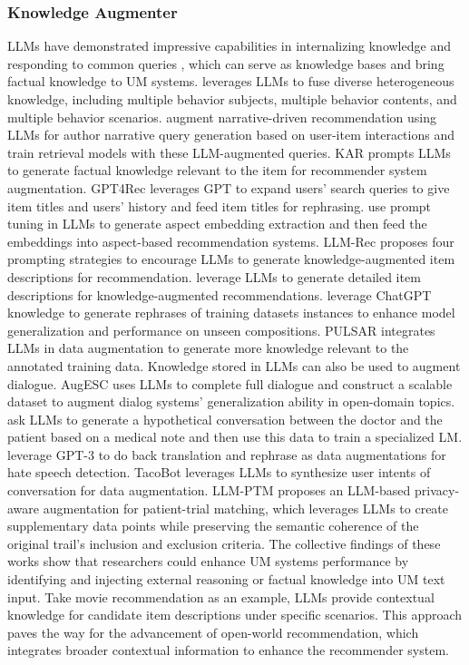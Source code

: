 \documentclass[11pt]{article}
\newcommand{\edit}[1]{\textcolor{blue}{#1}}
\newcommand{\comments}[1]{\textcolor{red}{[Re:~#1]}}
\begin{document}
\subsubsection{Knowledge Augmenter}
LLMs have demonstrated impressive capabilities in internalizing knowledge and responding to common queries \cite{ouyang2022training,openai2023gpt4}, which can serve as knowledge bases and bring factual knowledge to UM systems. \citet{yin2023heterogeneous} leverages LLMs to fuse diverse heterogeneous knowledge, including multiple behavior subjects, multiple behavior contents, and multiple behavior scenarios. \citet{mysore2023large} augment narrative-driven recommendation using LLMs for author narrative query generation based on user-item interactions and train retrieval models with these LLM-augmented queries. KAR \cite{xi2023towards} prompts LLMs to generate factual knowledge relevant to the item for recommender system augmentation. GPT4Rec \cite{li2023gpt4rec} leverages GPT to expand users' search queries to give item titles and users' history and feed item titles for rephrasing. \citet{li2023prompt} use prompt tuning in LLMs to generate aspect embedding extraction and then feed the embeddings into aspect-based recommendation systems. LLM-Rec \cite{lyu2023llm} proposes four prompting strategies to encourage LLMs to generate knowledge-augmented item descriptions for recommendation. \citet{acharya2023llm} leverage LLMs to generate detailed item descriptions for knowledge-augmented recommendations. \citet{fang2023chatgpt} leverage ChatGPT knowledge to generate rephrases of training datasets instances to enhance model generalization and performance on unseen compositions. PULSAR \cite{li2023pulsar} integrates LLMs in data augmentation to generate more knowledge relevant to the annotated training data. Knowledge stored in LLMs can also be used to augment dialogue. AugESC \cite{zheng2022augesc} uses LLMs to complete full dialogue and construct a scalable dataset to augment dialog systems' generalization ability in open-domain topics. \citet{schlegel2023pulsar} ask LLMs to generate a hypothetical conversation between the doctor and the patient based on a medical note and then use this data to train a specialized LM. \citet{cohen2023enhancing} leverage GPT-3 to do back translation and rephrase as data augmentations for hate speech detection. TacoBot \cite{mo2023roll} leverages LLMs to synthesize user intents of conversation for data augmentation. LLM-PTM \cite{yuan2023llm} proposes an LLM-based privacy-aware augmentation for patient-trial matching, which leverages LLMs to create supplementary data points while preserving the semantic coherence of the original trail's inclusion and exclusion criteria. 
The collective findings of these works show that researchers could enhance UM systems performance by identifying and injecting external reasoning or factual knowledge into UM text input. Take movie recommendation as an example, LLMs provide contextual knowledge for candidate item descriptions under specific scenarios. This approach paves the way for the advancement of open-world recommendation, which integrates broader contextual information to enhance the recommender system.
\end{document}
